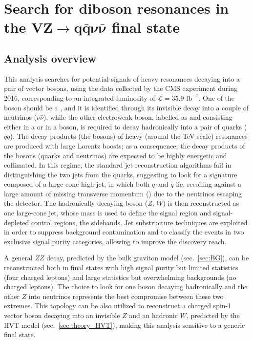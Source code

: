 \chapter{Search for diboson resonances in the $\mathbf{VZ \rightarrow  q \bar{q} \nu \bar{\nu}}$ final state}
\label{ch:analysis}
\section{Analysis overview}
\label{sec:analysis_overview}

This analysis searches for potential signals of heavy resonances decaying into a pair of vector bosons, using the data collected by the CMS experiment during 2016, corresponding to an integrated luminosity of $\mathcal{L}=35.9 \mbox{ fb}^{-1}$. One of the boson should be a \Z, and it is identified through its invisible decay into a couple of neutrinos ($\nu \bar{\nu}$), while the other electroweak boson, labelled as \V and consisting either in a \W or in a \Z boson, is required to decay hadronically into a pair of quarks ($q \bar{q}$). %
The decay products (the bosons) of heavy (around the TeV scale) resonances are produced with large Lorentz boosts; as a consequence, the decay products of the bosons (quarks and neutrinos) are expected to be highly energetic and collimated. In this regime, the standard jet reconstruction algorithms fail in distinguishing the two jets from the quarks, suggesting to look for a signature composed of a large-cone high-\pt jet, in which both $q$ and $\bar{q}$ lie, recoiling against a large amount of missing transverse momentum (\met) due to the neutrinos escaping the detector. The hadronically decaying boson ($Z$, $W$) is then reconstructed as one large-cone jet, whose mass is used to define the signal region and signal-depleted control regions, the sidebands. Jet substructure techniques are exploited in order to suppress background contamination and to classify the events in two exclusive signal purity categories, allowing to improve the discovery reach.

\noindent A general $ZZ$ decay, predicted by the bulk graviton model (sec.~\ref{sec:BG}), can be reconstructed both in final states with high signal purity but limited statistics (four charged leptons) and large statistics but overwhelming backgrounds (no charged leptons). The choice to look for one boson decaying hadronically and the other $Z$ into neutrinos represents the best compromise between these two extremes. This topology can be also utilized to reconstruct a charged spin-1 vector boson \Wp decaying into an invisible $Z$ and an hadronic $W$, predicted by the HVT model (sec.~\ref{sec:theory_HVT}), making this analysis sensitive to a generic \VZ final state.

